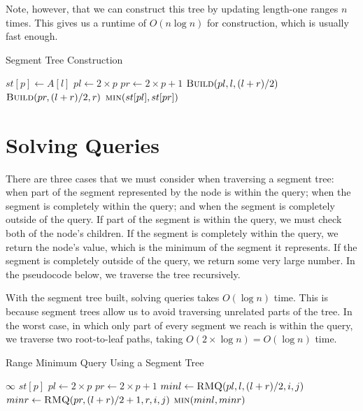\documentclass[11pt]{article}
\begin{document}
Note, however, that we can construct this tree by updating length-one ranges $n$ times. This gives us a runtime of $O(n \log n)$ for construction, which is usually fast enough.

\begin{algorithm}[H]
\caption{Segment Tree Construction}
\begin{algorithmic}
            \State $st[p] \gets A[l]$
        \Else
            \State $pl \gets 2 \times p$
            \State $pr \gets 2 \times p + 1$
            \State $\Call{Build}{pl, l, (l + r) / 2}$
            \State $\Call{Build}{pr, (l + r) / 2, r}$
            \State \Return $\Call{min}{st[pl], st[pr]}$
        \EndIf
    \EndFunction
\end{algorithmic}
\end{algorithm}

\section{Solving Queries}

There are three cases that we must consider when traversing a segment tree: when part of the segment represented by the node is within the query; when the segment is completely within the query; and when the segment is completely outside of the query. If part of the segment is within the query, we must check both of the node's children. If the segment is completely within the query, we return the node's value, which is the minimum of the segment it represents. If the segment is completely outside of the query, we return some very large number. In the pseudocode below, we traverse the tree recursively. 

With the segment tree built, solving queries takes $O(\log n)$ time. This is because segment trees allow us to avoid traversing unrelated parts of the tree. In the worst case, in which only part of every segment we reach is within the query, we traverse two root-to-leaf paths, taking $O(2 \times \log n) = O(\log n)$ time.

\begin{algorithm}[H]
\caption{Range Minimum Query Using a Segment Tree}
\begin{algorithmic}
            \State \Return $\infty$
        \EndIf
            \State \Return $st[p]$
        \EndIf
        \State $pl \gets 2 \times p$
        \State $pr \gets 2 \times p + 1$
        \State $minl \gets \Call{RMQ}{pl, l, (l + r) / 2, i, j}$
        \State $minr \gets \Call{RMQ}{pr, (l + r) / 2 + 1, r, i, j}$
        \State \Return $\Call{min}{minl, minr}$
    \EndFunction
\end{algorithmic}
\end{algorithm}
\end{document}
